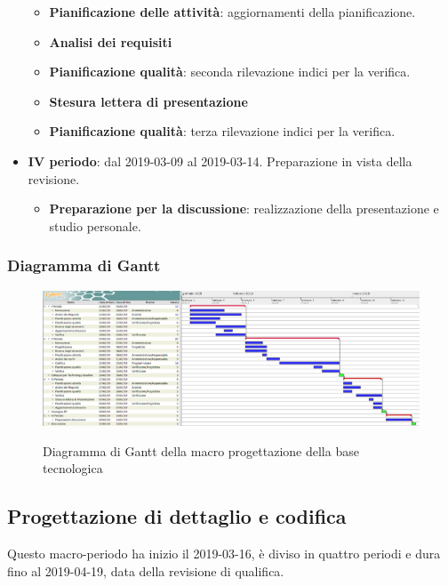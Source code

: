 \begin{itemize}
			\begin{itemize}
				\item \textbf{Pianificazione delle attività}: aggiornamenti della pianificazione.
				\item \textbf{Analisi dei requisiti}
				\item \textbf{Pianificazione qualità}: seconda rilevazione indici per la verifica.
				\item \textbf{Stesura lettera di presentazione}
				\item \textbf{Pianificazione qualità}: terza rilevazione indici per la verifica.
        	\end{itemize}
        	\item \textbf{IV periodo}: dal 2019-03-09 al 2019-03-14. Preparazione in vista della revisione.
        	\begin{itemize}
        		\item \textbf{Preparazione per la discussione}: realizzazione della presentazione e studio personale.
        	\end{itemize}
		\end{itemize}

        \begin{landscape}
			\subsubsection{Diagramma di Gantt}\label{GanttPianificazioneBaseTecnologica}
			\begin{figure}[H]
					\centering
					\includegraphics[scale=0.375]{img/Progettazione_della_base_tecnologica.png}\\
					\caption{Diagramma di Gantt della macro progettazione della base tecnologica}
			\end{figure}
		\end{landscape}
		\newpage

        \subsection{Progettazione di dettaglio e codifica}\label{PianificazioneDettaglio}
		Questo macro-periodo ha inizio il 2019-03-16, è diviso in quattro periodi e dura fino al 2019-04-19,
		data della revisione di qualifica.

